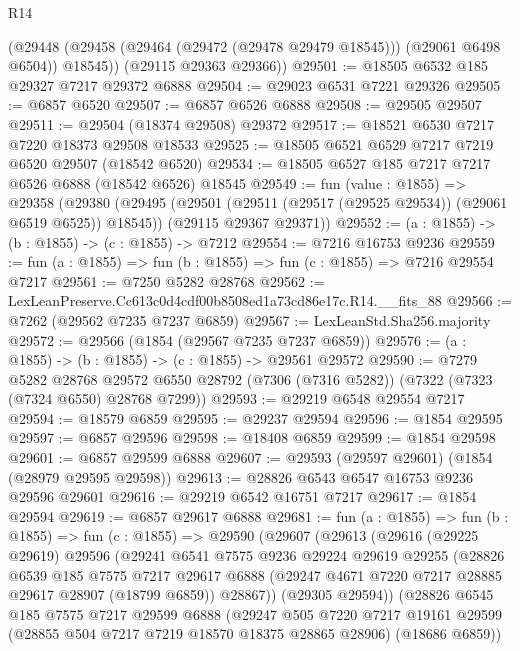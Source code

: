 \begin{lexlean}{R14}
\begin{coremodule}
        (@29448 (@29458 (@29464 (@29472 (@29478 @29479 @18545))) (@29061 @6498 @6504)) @18545))
      (@29115 @29363 @29366))
@29501 := @18505 @6532 @185 @29327 @7217 @29372 @6888
@29504 := @29023 @6531 @7221 @29326
@29505 := @6857 @6520
@29507 := @6857 @6526 @6888
@29508 := @29505 @29507
@29511 := @29504 (@18374 @29508) @29372
@29517 := @18521 @6530 @7217 @7220 @18373 @29508 @18533
@29525 := @18505 @6521 @6529 @7217 @7219 @6520 @29507 (@18542 @6520)
@29534 := @18505 @6527 @185 @7217 @7217 @6526 @6888 (@18542 @6526) @18545
@29549 := fun (value : @1855) =>
  @29358
    (@29380
      (@29495 (@29501 (@29511 (@29517 (@29525 @29534)) (@29061 @6519 @6525)) @18545))
      (@29115 @29367 @29371))
@29552 := (a : @1855) -> (b : @1855) -> (c : @1855) -> @7212
@29554 := @7216 @16753 @9236
@29559 := fun (a : @1855) => fun (b : @1855) => fun (c : @1855) => @7216 @29554 @7217
@29561 := @7250 @5282 @28768
@29562 := LexLeanPreserve.Cc613c0d4cdf00b8508ed1a73cd86e17c.R14.__fits_88
@29566 := @7262 (@29562 @7235 @7237 @6859)
@29567 := LexLeanStd.Sha256.majority
@29572 := @29566 (@1854 (@29567 @7235 @7237 @6859))
@29576 := (a : @1855) -> (b : @1855) -> (c : @1855) -> @29561 @29572
@29590 := @7279
    @5282
    @28768
    @29572
    @6550
    @28792
    (@7306 (@7316 @5282))
    (@7322 (@7323 (@7324 @6550) @28768 @7299))
@29593 := @29219 @6548 @29554 @7217
@29594 := @18579 @6859
@29595 := @29237 @29594
@29596 := @1854 @29595
@29597 := @6857 @29596
@29598 := @18408 @6859
@29599 := @1854 @29598
@29601 := @6857 @29599 @6888
@29607 := @29593 (@29597 @29601) (@1854 (@28979 @29595 @29598))
@29613 := @28826 @6543 @6547 @16753 @9236 @29596 @29601
@29616 := @29219 @6542 @16751 @7217
@29617 := @1854 @29594
@29619 := @6857 @29617 @6888
@29681 := fun (a : @1855) =>
  fun (b : @1855) =>
  fun (c : @1855) =>
  @29590
    (@29607
      (@29613
        (@29616
          (@29225 @29619)
          @29596
          (@29241
            @6541
            @7575
            @9236
            @29224
            @29619
            @29255
            (@28826
              @6539
              @185
              @7575
              @7217
              @29617
              @6888
              (@29247 @4671 @7220 @7217 @28885 @29617 @28907 (@18799 @6859))
              @28867))
          (@29305 @29594))
        (@28826
          @6545
          @185
          @7575
          @7217
          @29599
          @6888
          (@29247
            @505
            @7220
            @7217
            @19161
            @29599
            (@28855 @504 @7217 @7219 @18570 @18375 @28865 @28906)
            (@18686 @6859))

\end{coremodule}
\end{lexlean}

